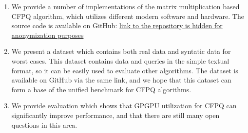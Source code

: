 \begin{enumerate}
\item We provide a number of implementations of the matrix multiplication based CFPQ algorithm, which utilizes different modern software and hardware.
The source code is available on GitHub: \href{link to the repository is hidden for anonymization purposes}{link to the repository is hidden for anonymization purposes} 
\item We present a dataset which contains both real data and syntatic data for worst cases.
This dataset contains data and queries in the simple textual format, so it can be easily used to evaluate other algorithms.
The dataset is available on GitHub via the same link, and we hope that this dataset can form a base of the unified benchmark for CFPQ algorithms.
\item We provide evaluation which shows that GPGPU utilization for CFPQ can significantly improve performance, and that there are still many open questions in this area.
\end{enumerate}

